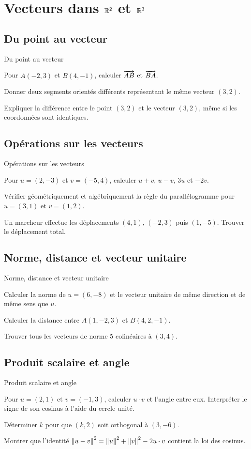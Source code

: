 \chapter{Vecteurs dans \texorpdfstring{$\mathbb{R}^2$ et $\mathbb{R}^3$}{R2 et R3}}
\label{workbook:chapter:09}
\section{Du point au vecteur}
\label{workbook:section:09.01}
\begin{exerciseblock}{Du point au vecteur}
\item Pour $A(-2,3)$ et $B(4,-1)$, calculer $\overrightarrow{AB}$ et $\overrightarrow{BA}$.
\item Donner deux segments orientés différents représentant le même vecteur $(3,2)$.
\item Expliquer la différence entre le point $(3,2)$ et le vecteur $(3,2)$, même si les coordonnées sont identiques.
\end{exerciseblock}
\section{Opérations sur les vecteurs}
\label{workbook:section:09.02}
\begin{exerciseblock}{Opérations sur les vecteurs}
\item Pour $u=(2,-3)$ et $v=(-5,4)$, calculer $u+v$, $u-v$, $3u$ et $-2v$.
\item Vérifier géométriquement et algébriquement la règle du parallélogramme pour $u=(3,1)$ et $v=(1,2)$.
\item Un marcheur effectue les déplacements $(4,1)$, $(-2,3)$ puis $(1,-5)$. Trouver le déplacement total.
\end{exerciseblock}
\section{Norme, distance et vecteur unitaire}
\label{workbook:section:09.03}
\begin{exerciseblock}{Norme, distance et vecteur unitaire}
\item Calculer la norme de $u=(6,-8)$ et le vecteur unitaire de même direction et de même sens que $u$.
\item Calculer la distance entre $A(1,-2,3)$ et $B(4,2,-1)$.
\item Trouver tous les vecteurs de norme $5$ colinéaires à $(3,4)$.
\end{exerciseblock}
\section{Produit scalaire et angle}
\label{workbook:section:09.04}
\begin{exerciseblock}{Produit scalaire et angle}
\item Pour $u=(2,1)$ et $v=(-1,3)$, calculer $u\cdot v$ et l'angle entre eux. Interpréter le signe de son cosinus à l'aide du cercle unité.
\item Déterminer $k$ pour que $(k,2)$ soit orthogonal à $(3,-6)$.
\item Montrer que l'identité $\left\lVert u-v\right\rVert^2=\left\lVert u\right\rVert^2+\left\lVert v\right\rVert^2-2u\cdot v$ contient la loi des cosinus.
\end{exerciseblock}
